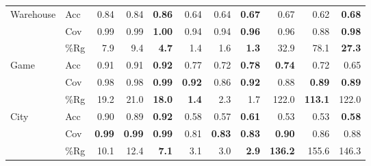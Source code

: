\documentclass[letterpaper]{article} %
\begin{document}
\begin{table}[bthp]
\begin{tabular}{@{}ll|rrr|rrr|rrr@{}}
\midrule
\multirow{3}{*}{Warehouse} & Acc      & 0.84                    & 0.84                    & \textbf{0.86}           & 0.64                    & 0.64                    & \textbf{0.67}           & 0.67                    & 0.62                    & \textbf{0.68}           \\
                           & Cov      & 0.99                    & 0.99                    & \textbf{1.00}           & 0.94                    & 0.94                    & \textbf{0.96}           & 0.96                    & 0.88                    & \textbf{0.98}           \\
                           & \%Rg     & 7.9                     & 9.4                     & \textbf{4.7}            & 1.4                     & 1.6                     & \textbf{1.3}            & 32.9                    & 78.1                    & \textbf{27.3}           \\
\midrule
\multirow{3}{*}{Game}      & Acc      & 0.91                    & 0.91                    & \textbf{0.92}           & 0.77                    & 0.72                    & \textbf{0.78}           & \textbf{0.74}           & 0.72                    & 0.65                    \\
                           & Cov      & 0.98                    & 0.98                    & \textbf{0.99}           & \textbf{0.92}           & 0.86                    & \textbf{0.92}           & 0.88                    & \textbf{0.89}           & \textbf{0.89}           \\
                           & \%Rg     & 19.2                    & 21.0                    & \textbf{18.0}           & \textbf{1.4}            & 2.3                     & 1.7                     & 122.0                   & \textbf{113.1}                   & 122.0          \\
\midrule
\multirow{3}{*}{City}      & Acc      & 0.90                    & 0.89                    & \textbf{0.92}           & 0.58                    & 0.57                    & \textbf{0.61}           & 0.53                    & 0.53                    & \textbf{0.58}           \\
                           & Cov      & \textbf{0.99}           & \textbf{0.99}           & \textbf{0.99}           & 0.81                    & \textbf{0.83}           & \textbf{0.83}           & \textbf{0.90}           & 0.86                    & 0.88                    \\
                           & \%Rg     & 10.1                    & 12.4                    & \textbf{7.1}            & 3.1                     & 3.0                     & \textbf{2.9}            & \textbf{136.2}          & 155.6                   & 146.3                   \\

\end{tabular}
\end{table}
\end{document}
